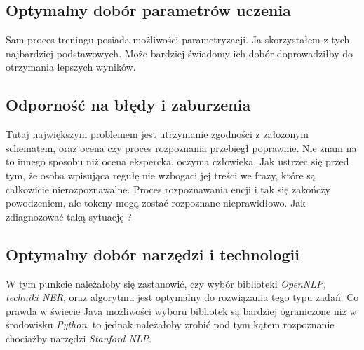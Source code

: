 \subsection{Optymalny dobór parametrów uczenia}
Sam proces treningu posiada możliwości parametryzacji. Ja skorzystałem z tych najbardziej podstawowych. Może bardziej świadomy ich dobór doprowadziłby do otrzymania lepszych wyników.
\subsection{Odporność na błędy i zaburzenia}
Tutaj największym problemem jest utrzymanie zgodności z założonym schematem, oraz ocena czy proces rozpoznania przebiegł poprawnie. Nie znam na to innego sposobu niż ocena ekspercka, oczyma człowieka. Jak ustrzec się przed tym, że osoba wpisująca regułę nie wzbogaci jej treści we frazy, które są całkowicie nierozpoznawalne. Proces rozpoznawania encji i tak się zakończy powodzeniem, ale tokeny mogą zostać rozpoznane nieprawidłowo. Jak zdiagnozować taką sytuację ?
\subsection{Optymalny dobór narzędzi i technologii}
W tym punkcie należałoby się zastanowić, czy wybór biblioteki \textit{OpenNLP, techniki NER}, oraz algorytmu jest optymalny do rozwiązania tego typu zadań. Co prawda w świecie Java możliwości wyboru bibliotek są bardziej ograniczone niż w środowisku \textit{Python}, to jednak należałoby zrobić pod tym kątem rozpoznanie chociażby narzędzi \textit{Stanford NLP}.